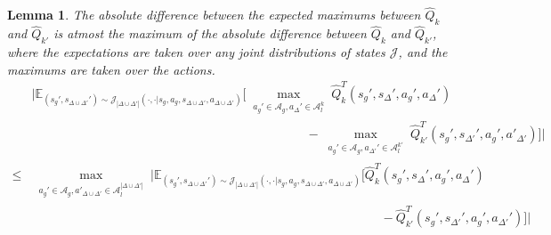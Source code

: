 \documentclass{article}
\theoremstyle{plain}
\newtheorem{lemma}[theorem]{Lemma}
\theoremstyle{definition}
\def\E{\mathbb{E}}
\begin{document}
\begin{lemma}The absolute difference between the expected maximums between $\hat{Q}_k$ and $\hat{Q}_{k'}$ is atmost the maximum of the absolute difference between $\hat{Q}_k$ and $\hat{Q}_{k'}$, where the expectations are taken over any joint distributions of states $\mathcal{J}$, and the maximums are taken over the actions.
\label{lemma: expectation_expectation_max_swap}\begin{align*}
&\bigg|\E_{(s_g',s_{\Delta\cup\Delta'}')\sim\mathcal{J}_{|\Delta\cup\Delta'|}(\cdot,\cdot|s_g,a_g,s_{\Delta\cup\Delta'}, a_{\Delta\cup\Delta'})}\bigg[\max_{\substack{a_g'\in\mathcal{A}_g, a_\Delta'\in \mathcal{A}_l^k}} \hat{Q}_k^T(s_g',s_\Delta',a_g',a_\Delta') \\
&\quad\quad\quad\quad\quad\quad\quad\quad\quad\quad\quad\quad\quad\quad\quad\quad\quad \quad\quad\quad \quad\quad-\max_{\substack{a_g'\in\mathcal{A}_g, a_{\Delta'}'\in \mathcal{A}_l^{k'}}} \hat{Q}_{k'}^T(s_g',s_{\Delta'}', a_g',a'_{\Delta'})\bigg]\bigg| \\
\leq &\max_{\substack{a_g'\in\mathcal{A}_g, a'_{\Delta\cup\Delta'}\in \mathcal{A}_l^{|\Delta\cup\Delta'|}}}\bigg|\E_{(s_g',s_{\Delta\cup\Delta'}')\sim\mathcal{J}_{|\Delta\cup\Delta'|}(\cdot,\cdot|s_g,a_g,s_{\Delta\cup\Delta'},a_{\Delta\cup\Delta'})}\bigg[\hat{Q}_k^T(s_g',s_\Delta',a_g',a_\Delta') \\ &\quad\quad\quad\quad\quad\quad\quad\quad\quad\quad\quad\quad\quad\quad\quad\quad\quad\quad\quad\quad\quad\quad\quad\quad\quad\quad\quad\quad- \hat{Q}_{k'}^T(s_g',s_{\Delta'}',a_g',a_{\Delta'}')\bigg]\bigg|\end{align*}
\end{lemma}
\end{document}
